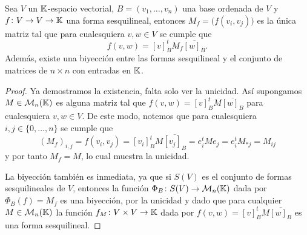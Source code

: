 \begin{teor}
  Sea $V$ un $\mathbb{K}$-espacio vectorial, $B = (v_1,\ldots,v_n)$ una base ordenada de $V$ y $f\colon V\to V \to\mathbb{K}$ una forma sesquilineal, entonces $M_f = \bigl(f(v_i,v_j)\bigr)$ es la única matriz tal que para cualesquiera $v,w \in V$ se cumple que
    \[
      f(v,w) =  [v]_B^t M_f \overline{[w]_B}.
    \]
   Además, existe una biyección entre las formas sesquilineal y el conjunto de matrices de $n\times n$ con entradas en $\mathbb{K}$.
\end{teor}
\begin{proof}
  Ya demostramos la existencia, falta solo ver la unicidad. Así supongamos $M \in \mathcal{M}_n(\mathbb{K})$ es alguna matriz tal que $f(v,w) =  [v]_B^t M \overline{[w]_B}$ para cualesquiera $v,w \in V$. De este modo, notemos que para cualesquiera $i,j \in \{0,\ldots,n\}$ se cumple que
    \[
      (M_f)_{i,j} = f(v_i,v_j) = [v_i]_B^t M \overline{[v_j]_B} = e_i^t M e_j = e_i^t M_{*j} = M_{ij}
    \]
  y por tanto $M_f = M$, lo cual muestra la unicidad.
  
  La biyección también es inmediata, ya que si $S(V)$ es el conjunto de formas sesquilineales de $V$, entonces la función $\Phi_B\colon S(V) \to \mathcal{M}_n(\mathbb{K})$ dada por $\Phi_B(f) = M_f$ es una biyección, por la unicidad y dado que para cualquier $M\in\mathcal{M}_n(\mathbb{K})$ la función $f_M\colon V\times V \to \mathbb{K}$ dada por $f(v,w) = [v]_B^t M \overline{[w]_B}$ es una forma sesquilineal.
\end{proof}